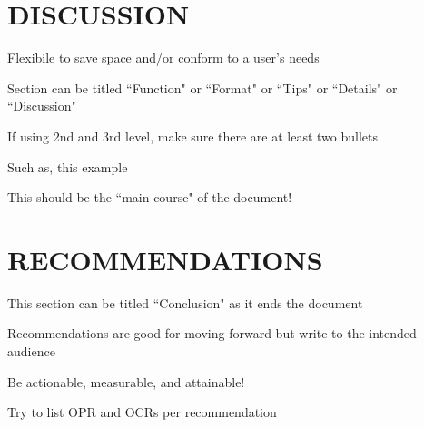 \documentclass[a4paper,11pt]{extarticle}
\begin{document}

\section*{DISCUSSION}

\begin{myBullets}
    \item Flexibile to save space and/or conform to a user's needs
    \begin{myBullets}
        \item Section can be titled ``Function" or ``Format" or ``Tips" or ``Details" or ``Discussion"
        \item If using 2nd and 3rd level, make sure there are at least two bullets
        \item Such as, this example
    \end{myBullets}
    \item This should be the ``main course" of the document!
\end{myBullets}



\section*{RECOMMENDATIONS}


\begin{myBullets}
    \item This section can be titled ``Conclusion" as it ends the document
    \item Recommendations are good for moving forward but write to the intended audience
    \item Be actionable, measurable, and attainable!
    \item Try to list OPR and OCRs per recommendation

\end{myBullets}
\end{document}

